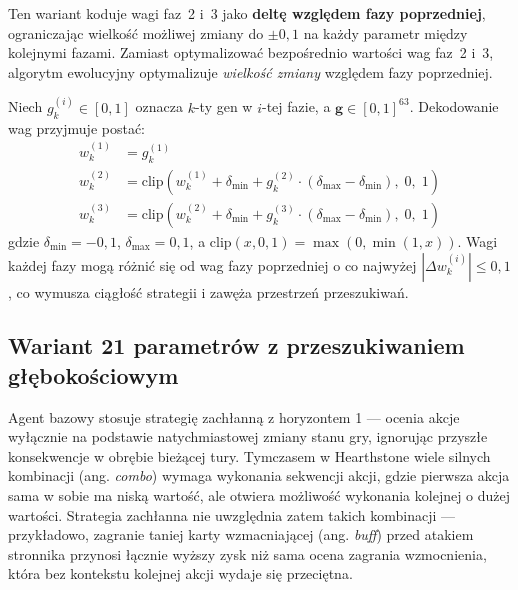 Ten wariant koduje wagi faz~2 i~3 jako \textbf{deltę względem fazy poprzedniej}, ograniczając wielkość możliwej zmiany do $\pm 0{,}1$ na każdy parametr między kolejnymi fazami. Zamiast optymalizować bezpośrednio wartości wag faz~2 i~3, algorytm ewolucyjny optymalizuje \emph{wielkość zmiany} względem fazy poprzedniej.

Niech $g^{(i)}_k \in [0,1]$ oznacza $k$-ty gen w $i$-tej fazie, a $\mathbf{g} \in [0,1]^{63}$. Dekodowanie wag przyjmuje postać:
\begin{align}
    w^{(1)}_k &= g^{(1)}_k
    \label{eq:smooth1} \\
    w^{(2)}_k &= \text{clip}\!\left(
        w^{(1)}_k + \delta_{\min}
        + g^{(2)}_k \cdot (\delta_{\max} - \delta_{\min}),
        \; 0,\; 1\right)
    \label{eq:smooth2} \\
    w^{(3)}_k &= \text{clip}\!\left(
        w^{(2)}_k + \delta_{\min}
        + g^{(3)}_k \cdot (\delta_{\max} - \delta_{\min}),
        \; 0,\; 1\right)
    \label{eq:smooth3}
\end{align}
gdzie $\delta_{\min} = -0{,}1$, $\delta_{\max} = 0{,}1$, a $\text{clip}(x, 0, 1) = \max(0, \min(1, x))$. Wagi każdej fazy mogą różnić się od wag fazy poprzedniej o co najwyżej $|\Delta w^{(i)}_k| \leq 0{,}1$, co wymusza ciągłość strategii i zawęża przestrzeń przeszukiwań.

\subsection{Wariant 21 parametrów z przeszukiwaniem głębokościowym}
\label{sec:agent21depth}

Agent bazowy stosuje strategię zachłanną z horyzontem 1 --- ocenia akcje wyłącznie na podstawie natychmiastowej zmiany stanu gry, ignorując przyszłe konsekwencje w obrębie bieżącej tury. Tymczasem w Hearthstone wiele silnych kombinacji (ang. \textit{combo}) wymaga wykonania sekwencji akcji, gdzie pierwsza akcja sama w sobie ma niską wartość, ale otwiera możliwość wykonania kolejnej o dużej wartości. Strategia zachłanna nie uwzględnia zatem takich kombinacji --- przykładowo, zagranie taniej karty wzmacniającej (ang. \textit{buff}) przed atakiem stronnika przynosi łącznie wyższy zysk niż sama ocena zagrania wzmocnienia, która bez kontekstu kolejnej akcji wydaje się przeciętna.

